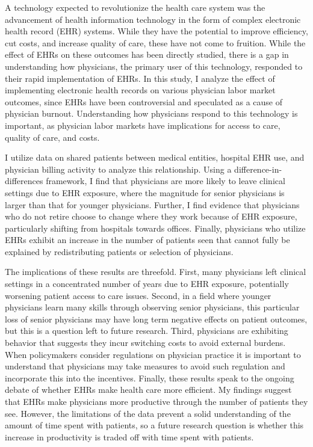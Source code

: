 \documentclass[12pt]{article}
\begin{document}
A technology expected to revolutionize the health care system was the advancement of health information technology in the form of complex electronic health record (EHR) systems. While they have the potential to improve efficiency, cut costs, and increase quality of care, these have not come to fruition. While the effect of EHRs on these outcomes has been directly studied, there is a gap in understanding how physicians, the primary user of this technology, responded to their rapid implementation of EHRs. In this study, I analyze the effect of implementing electronic health records on various physician labor market outcomes, since EHRs have been controversial and speculated as a cause of physician burnout. Understanding how physicians respond to this technology is important, as physician labor markets have implications for access to care, quality of care, and costs. 

I utilize data on shared patients between medical entities, hospital EHR use, and physician billing activity to analyze this relationship. Using a difference-in-differences framework, I find that physicians are more likely to leave clinical settings due to EHR exposure, where the magnitude for senior physicians is larger than that for younger physicians. Further, I find evidence that physicians who do not retire choose to change where they work because of EHR exposure, particularly shifting from hospitals towards offices. Finally, physicians who utilize EHRs exhibit an increase in the number of patients seen that cannot fully be explained by redistributing patients or selection of physicians. 

The implications of these results are threefold. First, many physicians left clinical settings in a concentrated number of years due to EHR exposure, potentially worsening patient access to care issues. Second, in a field where younger physicians learn many skills through observing senior physicians, this particular loss of senior physicians may have long term negative effects on patient outcomes, but this is a question left to future research. Third, physicians are exhibiting behavior that suggests they incur switching costs to avoid external burdens. When policymakers consider regulations on physician practice it is important to understand that physicians may take measures to avoid such regulation and incorporate this into the incentives. Finally, these results speak to the ongoing debate of whether EHRs make health care more efficient. My findings suggest that EHRs make physicians more productive through the number of patients they see. However, the limitations of the data prevent a solid understanding of the amount of time spent with patients, so a future research question is whether this increase in productivity is traded off with time spent with patients.  
 
\end{document}
